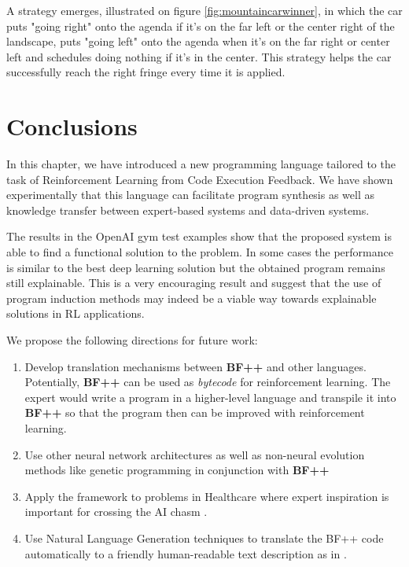 A strategy emerges, illustrated on figure \ref{fig:mountaincarwinner}, in which the car puts "going right" onto the agenda if it's on the far left or the center right of the landscape, puts "going left" onto the agenda when it's on the far right or center left and schedules doing nothing if it's in the center.
This strategy helps the car successfully reach the right fringe every time it is applied.

\newpage
\section{Conclusions}

In this chapter, we have introduced a new programming language tailored to the task of Reinforcement Learning from Code Execution Feedback.
We have shown experimentally that this language can facilitate program synthesis as well as knowledge transfer between expert-based systems and data-driven systems. 

The results in the OpenAI gym test examples show that the proposed system is able to find a functional solution to the problem. In some cases the performance is similar to the best deep learning solution but the obtained program remains still explainable. This is a very encouraging result and suggest that the use of program induction methods may indeed be a viable way towards explainable solutions in RL applications. 

We propose the following directions for future work:
\begin{enumerate}
    \item Develop translation mechanisms between \textbf{BF++} and other languages. Potentially, \textbf{BF++} can be used as \emph{bytecode} \cite{bytecode} for reinforcement learning. The expert would write a program in a higher-level language and transpile it into \textbf{BF++} so that the program then can be improved with reinforcement learning.
    \item Use other neural network architectures as well as non-neural evolution methods like genetic programming \cite{genprog1,genprog2} in conjunction with \textbf{BF++}
    \item Apply the framework to problems in Healthcare where expert inspiration is important for crossing the AI chasm \cite{aichasm}.    \item Use Natural Language Generation techniques to translate the BF++ code automatically to a friendly human-readable text description as in \cite{richardsonCode2TextChallengeText2017,code2nlg2}.
\end{enumerate}